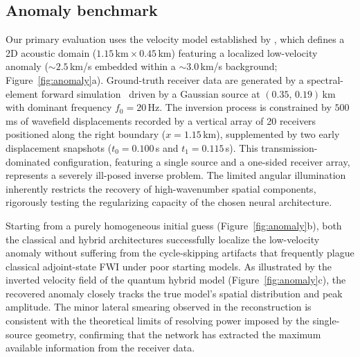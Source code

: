 \documentclass[11pt,a4paper]{article}
\begin{document}
\subsection{Anomaly benchmark}
\label{sec:results_anomaly}

Our primary evaluation uses the velocity model established by \citet{rahst}, which defines a 2D acoustic domain ($1.15$\,km\,$\times$\,$0.45$\,km) featuring a localized low-velocity anomaly ($\sim$$2.5$\,km/s embedded within a $\sim$$3.0$\,km/s background; Figure~\ref{fig:anomaly}a). Ground-truth receiver data are generated by a spectral-element forward simulation~\citep{komatitsch1998spectral} driven by a Gaussian source at $(0.35,\,0.19)$\,km with dominant frequency $f_0 = 20$\,Hz. The inversion process is constrained by $500$\,ms of wavefield displacements recorded by a vertical array of 20 receivers positioned along the right boundary ($x = 1.15$\,km), supplemented by two early displacement snapshots ($t_0 = 0.100$\,s and $t_1 = 0.115$\,s). This transmission-dominated configuration, featuring a single source and a one-sided receiver array, represents a severely ill-posed inverse problem. The limited angular illumination inherently restricts the recovery of high-wavenumber spatial components, rigorously testing the regularizing capacity of the chosen neural architecture.

Starting from a purely homogeneous initial guess (Figure~\ref{fig:anomaly}b), both the classical and hybrid architectures successfully localize the low-velocity anomaly without suffering from the cycle-skipping artifacts that frequently plague classical adjoint-state FWI under poor starting models. As illustrated by the inverted velocity field of the quantum hybrid model (Figure~\ref{fig:anomaly}c), the recovered anomaly closely tracks the true model's spatial distribution and peak amplitude. The minor lateral smearing observed in the reconstruction is consistent with the theoretical limits of resolving power imposed by the single-source geometry, confirming that the network has extracted the maximum available information from the receiver data.
\end{document}
